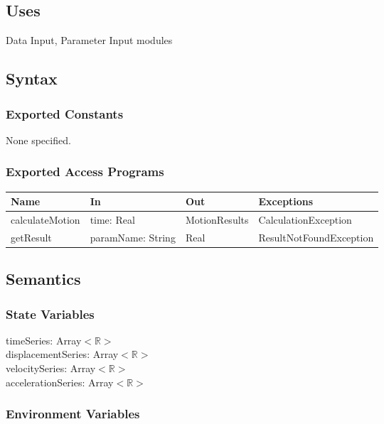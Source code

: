 \documentclass[12pt, titlepage]{article}
\begin{document}
\subsection{Uses}
Data Input, Parameter Input modules

\subsection{Syntax}

\subsubsection{Exported Constants}
None specified.

\subsubsection{Exported Access Programs}

\begin{center}
\begin{tabular}{p{4cm} p{4cm} p{3cm} p{5cm}}
\hline
\textbf{Name} & \textbf{In} & \textbf{Out} & \textbf{Exceptions} \\
\hline
calculateMotion & time: Real & MotionResults & CalculationException \\
getResult & paramName: String & Real & ResultNotFoundException \\
\hline
\end{tabular}
\end{center}

\subsection{Semantics}

\subsubsection{State Variables}
timeSeries: Array$<\mathbb{R}>$\\ %
displacementSeries: Array$<\mathbb{R}>$\\ %
velocitySeries: Array$<\mathbb{R}>$\\ %
accelerationSeries: Array$<\mathbb{R}>$ %

\subsubsection{Environment Variables}
\end{document}
